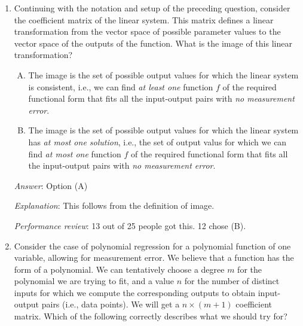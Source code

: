 \documentclass[10pt]{amsart}
\begin{document}
\begin{enumerate}
  {\em Answer}: Option (D)

  {\em Explanation}: We are trying to find the line or curve. That's
  the whole goal of regression. And the way we do this is by choosing
  a general functional form and then using regression to estimate the
  parameters in that functional form.

  {\em Performance review}: 20 out of 25 people got this. 5 chose (C).

\item Continuing with the notation and setup of the preceding
  question, consider the coefficient matrix of the linear system. This
  matrix defines a linear transformation from the vector space of
  possible parameter values to the vector space of the outputs of the
  function. What is the image of this linear transformation?

  \begin{enumerate}[(A)]
  \item The image is the set of possible output values for which the
    linear system is consistent, i.e., we can find {\em at least one}
    function $f$ of the required functional form that fits all the
    input-output pairs with {\em no measurement error}.
  \item The image is the set of possible output values for which the
    linear system has {\em at most one solution}, i.e., the set of
    output valus for which we can find {\em at most one} function $f$
    of the required functional form that fits all the input-output
    pairs with {\em no measurement error}.
  \end{enumerate}

  {\em Answer}: Option (A)

  {\em Explanation}: This follows from the definition of image.

  {\em Performance review}: 13 out of 25 people got this. 12 chose (B).

\item Consider the case of polynomial regression for a polynomial
  function of one variable, allowing for measurement error. We believe
  that a function has the form of a polynomial. We can tentatively
  choose a degree $m$ for the polynomial we are trying to fit, and a
  value $n$ for the number of distinct inputs for which we compute the
  corresponding outputs to obtain input-output pairs (i.e., data
  points). We will get a $n \times (m + 1)$ coefficient matrix. Which
  of the following correctly describes what we should try for?


\end{enumerate}
\end{document}
